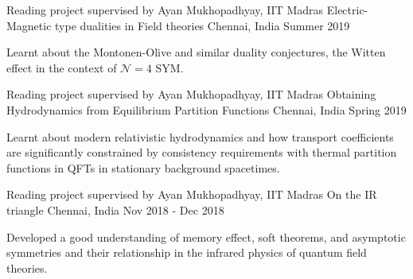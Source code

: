\begin{cventries}
    \vspace{1ex}

  \cventry
    {Reading project supervised by Ayan Mukhopadhyay, IIT Madras} %
    {Electric-Magnetic type dualities in Field theories} %
    {Chennai, India} %
    {Summer 2019} %
    {
      \begin{cvitems} %
        \item {Learnt about the Montonen-Olive and similar duality conjectures, the Witten effect in the context of $\mathcal{N}=4$ SYM.}
      \end{cvitems}
    }

    \vspace{1ex}

  \cventry
    {Reading project supervised by Ayan Mukhopadhyay, IIT Madras} %
    {Obtaining Hydrodynamics from Equilibrium Partition Functions} %
    {Chennai, India} %
    {Spring 2019} %
    {
      \begin{cvitems} %
        \item {Learnt about modern relativistic hydrodynamics and how transport coefficients are significantly constrained by consistency requirements with thermal partition functions in QFTs in stationary background spacetimes.}
      \end{cvitems}
    }

    \vspace{1ex}
  \cventry
    {Reading project supervised by Ayan Mukhopadhyay, IIT Madras} %
    {On the IR triangle} %
    {Chennai, India} %
    {Nov 2018 - Dec 2018} %
    {
      \begin{cvitems} %
        \item {Developed a good understanding of memory effect, soft theorems, and asymptotic symmetries and their relationship in the infrared physics of quantum field theories.}
      \end{cvitems}
    }

\end{cventries}

\vspace{2cm}
